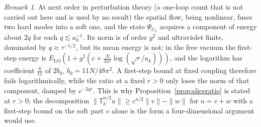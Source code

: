 \documentclass[aps,prd,twocolumn,superscriptaddress,nofootinbib,longbibliography,floatfix,amsmath,amssymb,10pt]{revtex4-2}
\theoremstyle{definition}
\theoremstyle{remark}
\newtheorem{remark}[theorem]{Remark}
\begin{document}
\begin{remark}
At next order in perturbation theory (a one-loop count that is not carried out here and is used by no result) the spatial flow, being nonlinear, fuses two hard modes into a
soft one, and the state $\Psi_{U_k}$ acquires a component of energy about
$2q$ for each $q\lesssim a_k^{-1}$. Its norm is of order $g^2$ and ultraviolet
finite, dominated by $q\approx\tau^{-1/2}$, but its mean energy is not: in the
free vacuum the first-step energy is $E_{\mathrm{LO}}(1+g^2(c+\frac
N{3\pi^2}\log(\sqrt\tau/a_k)))$, and the logarithm has coefficient
$\frac8{11}$ of $2b_0$, $b_0=11N/48\pi^2$. A first-step bound at fixed
coupling therefore fails logarithmically, while the ratio at a fixed $r>0$
only loses the norm of that component, damped by $e^{-2qr}$. This is why
Proposition~\ref{prop:sliceratio} is stated at $r>0$; the decomposition
$\|\mathbb T_k^{n/2}u\|\ge c^{n/2}\|v\|-\|w\|$ for $u=v+w$ with a first-step
bound on the soft part $v$ alone is the form a four-dimensional argument
would use.
\end{remark}
\end{document}
